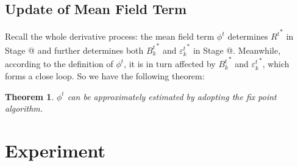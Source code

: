 \documentclass[conference]{IEEEtran}
\makeatletter
\newcommand{\Rmnum}[1]{\expandafter\@slowromancap\romannumeral #1@}
\newtheorem{theorem}{Theorem}
\makeatother
\begin{document}
\subsection{Update of Mean Field Term}
Recall the whole derivative process: the mean field term $\phi^t$ determines ${R^t}^*$ in Stage \Rmnum{1} and further determines both ${B_k^t}^*$ and ${\varepsilon_k^t}^*$ in Stage \Rmnum{2}.
Meanwhile, according to the definition of $\phi^t$, it is in turn affected by ${B_k^t}^*$ and ${\varepsilon_k^t}^*$, which forms a close loop.
So we have the following theorem:
\begin{theorem}
    $\phi^t$ can be approximately estimated by adopting the fix point algorithm.
\end{theorem}



\section{Experiment}
\end{document}
